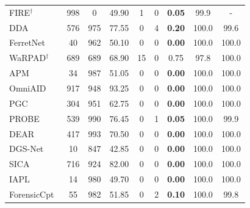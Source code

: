 \begin{table}[t]
{\begin{tabular}{l ccc ccc cc}
        FIRE$^\dagger$~\cite{fire} & 998 & 0 & 49.90 & 1 & 0 & \cellcolor{red!12}\textbf{0.05} & 99.9 & - \\
        DDA~\cite{dda} & 576 & 975 & 77.55 & 0 & 4 & \cellcolor{red!12}\textbf{0.20} & 100.0 & 99.6 \\
        FerretNet~\cite{ferretnet} & 40 & 962 & 50.10 & 0 & 0 & \cellcolor{red!12}\textbf{0.00} & 100.0 & 100.0 \\
        WaRPAD$^\dagger$~\cite{warpad} & 689 & 689 & 68.90 & 15 & 0 & \cellcolor{yellow!20}0.75 & 97.8 & 100.0 \\
        APM~\cite{allpatchesmatter} & 34 & 987 & 51.05 & 0 & 0 & \cellcolor{red!12}\textbf{0.00} & 100.0 & 100.0 \\
        OmniAID~\cite{omniaid} & 917 & 948 & \cellcolor{green!15}93.25 & 0 & 0 & \cellcolor{red!12}\textbf{0.00} & 100.0 & 100.0 \\
        PGC~\cite{pgc} & 304 & 951 & 62.75 & 0 & 0 & \cellcolor{red!12}\textbf{0.00} & 100.0 & 100.0 \\
        PROBE~\cite{probe} & 539 & 990 & 76.45 & 0 & 1 & \cellcolor{red!12}\textbf{0.05} & 100.0 & 99.9 \\
        DEAR~\cite{dear} & 417 & 993 & 70.50 & 0 & 0 & \cellcolor{red!12}\textbf{0.00} & 100.0 & 100.0 \\
        DGS-Net~\cite{dgsnet} & 10 & 847 & 42.85 & 0 & 0 & \cellcolor{red!12}\textbf{0.00} & 100.0 & 100.0 \\
        SICA~\cite{sica} & 716 & 924 & \cellcolor{green!15}82.00 & 0 & 0 & \cellcolor{red!12}\textbf{0.00} & 100.0 & 100.0 \\
        IAPL~\cite{iapl} & 14 & 980 & 49.70 & 0 & 0 & \cellcolor{red!12}\textbf{0.00} & 100.0 & 100.0 \\
        ForensicCpt~\cite{forensicconcept} & 55 & 982 & 51.85 & 0 & 2 & \cellcolor{red!12}\textbf{0.10} & 100.0 & 99.8 \\
        \bottomrule
        \end{tabular}
        }%
        \vspace{-.35cm}
\end{table}
